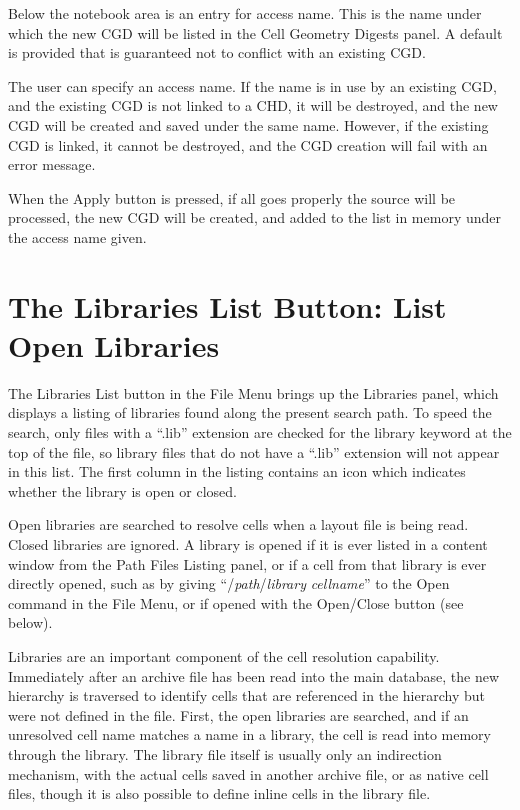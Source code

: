 Below the notebook area is an entry for access name.  This is the name
under which the new CGD will be listed in the {\cb Cell Geometry
Digests} panel.  A default is provided that is guaranteed not to
conflict with an existing CGD.

The user can specify an access name.  If the name is in use by an
existing CGD, and the existing CGD is not linked to a CHD, it will be
destroyed, and the new CGD will be created and saved under the same
name.  However, if the existing CGD is linked, it cannot be destroyed,
and the CGD creation will fail with an error message.

When the {\cb Apply} button is pressed, if all goes properly the
source will be processed, the new CGD will be created, and added to
the list in memory under the access name given.




\section{The {\cb Libraries List} Button:  List Open Libraries}
\label{libraries}

The {\cb Libraries List} button in the {\cb File Menu} brings up the
{\cb Libraries} panel, which displays a listing of libraries found
along the present search path.  To speed the search, only files with a
``{\vt .lib}'' extension are checked for the library keyword at the
top of the file, so library files that do not have a ``{\vt .lib}''
extension will not appear in this list.  The first column in the
listing contains an icon which indicates whether the library is open
or closed.

Open libraries are searched to resolve cells when a layout file is
being read.  Closed libraries are ignored.  A library is opened if it
is ever listed in a content window from the {\cb Path Files Listing}
panel, or if a cell from that library is ever directly opened, such as
by giving ``/{\it path\/}/{\it library} {\it cellname}'' to the {\cb
Open} command in the {\cb File Menu}, or if opened with the {\cb
Open/Close} button (see below).

Libraries are an important component of the {\Xic} cell resolution
capability.  Immediately after an archive file has been read into the
main database, the new hierarchy is traversed to identify cells that
are referenced in the hierarchy but were not defined in the file. 
First, the open libraries are searched, and if an unresolved cell name
matches a name in a library, the cell is read into memory through the
library.  The library file itself is usually only an indirection
mechanism, with the actual cells saved in another archive file, or as
native cell files, though it is also possible to define inline cells
in the library file.

